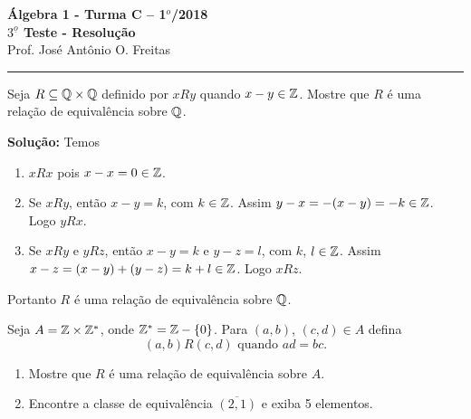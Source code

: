 \documentclass[12pt]{article}
\begin{document}


\begin{center}
{\Large\bf {\'A}lgebra 1 - Turma C -- 1$^{o}$/2018} \\ \vspace{9pt} {\large\bf
  $3^{\underline{o}}$ Teste - Resolu\c{c}\~ao}\\
\vspace{9pt} Prof. Jos{\'e} Ant{\^o}nio O. Freitas
\end{center}
\hrule

\vspace{.6cm}

\questao Seja $R \subseteq \mathbb{Q} \times \mathbb{Q}$ definido por $xRy$ quando $x - y \in \mathbb{Z}$. Mostre que $R$ é uma relação de equivalência sobre $\mathbb{Q}$.

\noindent\textbf{Solu\c{c}\~ao:} Temos
\begin{enumerate}[label={\roman*})]
	\item $xRx$ pois $x - x = 0 \in \mathbb{Z}$.
	\item Se $xRy$, então $x - y = k$, com $k \in \mathbb{Z}$. Assim $y - x = -(x - y) = -k \in \mathbb{Z}$. Logo $yRx$.
	\item Se $xRy$ e $yRz$, então $x - y = k$ e $y - z = l$, com $k$, $l \in \mathbb{Z}$. Assim $x - z = (x - y) + (y - z) = k + l \in \mathbb{Z}$. Logo $xRz$.
\end{enumerate}

Portanto $R$ é uma relação de equivalência sobre $\mathbb{Q}$.


\vspace{.5cm}

\questao Seja $A = \mathbb{Z} \times \mathbb{Z}^*$, onde $\mathbb{Z}^* = \mathbb{Z} - \{0\}$. Para $(a,b)$, $(c,d) \in A$ defina
\[
	(a,b)R(c,d) \mbox{ quando } ad=bc.
\]

\begin{enumerate}[label={\alph*})]
	\item Mostre que $R$ é uma rela{\c c}{\~a}o de equival{\^e}ncia sobre $A$.
	\item Encontre a classe de equivalência $\overline{(2,1)}$ e exiba 5 elementos.
\end{enumerate}
\end{document}
